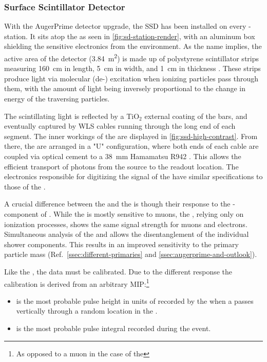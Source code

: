 \subsubsection{Surface Scintillator Detector}
\label{sssec:ssd}

With the AugerPrime detector upgrade, the \acf{SSD} has been installed on every
\SD-station. It sits atop the \WCD as seen in \cref{fig:sd-station-render}, 
with an aluminum box shielding the sensitive electronics from the environment. 
As the name implies, the active area of the detector 
(\SI{3.84}{\meter\squared}) is made up of polystyrene scintillator strips 
measuring \SI{160}{\centi\meter} in length, \SI{5}{\centi\meter} in width, and
\SI{1}{\centi\meter} in thickness \cite{cataldiUpgradePierreAuger2022}. These 
strips produce light via molecular (de-) excitation when ionizing particles 
pass through them, with the amount of light being inversely proportional to the
change in energy of the traversing particles.

The scintillating light is reflected by a TiO$_2$ external coating of the bars,
and eventually captured by \acf{WLS} cables running through the long end of 
each segment. The inner workings of the \SSD are displayed in 
\cref{fig:ssd-high-contrast}. From there, the \WLSs are arranged in a "U" 
configuration, where both ends of each cable are coupled via optical cement to 
a \SI{38}{\milli\meter} Hamamatsu R942 \PMT 
\cite{hamamatsuphotonicsPhotomultiplierTubeR9420}. This allows the efficient 
transport of photons from the source to the readout location. The electronics 
responsible for digitizing the signal of the \SSD \PMT have similar 
specifications to those of the \WCD 
\cite{collaborationPierreAugerObservatory2016}.

A crucial difference between the \WCD and the \SSD is though their response 
to the \EM-component of \EASs. While the \WCD is mostly sensitive to muons, the
\SSD, relying only on ionization processes, shows the same signal strength for
muons and electrons. Simultaneous analysis of the \WCD and \SSD allows the 
disentanglement of the individual shower components. This results in an 
improved sensitivity to the primary particle mass (Ref.\ 
\cref{ssec:different-primaries} and \cref{ssec:augerprime-and-outlook}). 

Like the \WCD, the \SSD data must be calibrated. Due to the different response 
the calibration is derived from an arbitrary \acf{MIP}:\footnote{As 
opposed to a muon in the case of the \WCD}

\begin{itemize}
	\item \Imip is the most probable pulse height in units of \ADC recorded
	by the \SSD \PMT when a \MIP passes vertically through a random 
	location in the \SSD.
	\item \Qmip is the most probable pulse integral recorded during the 
	event.
\end{itemize}

